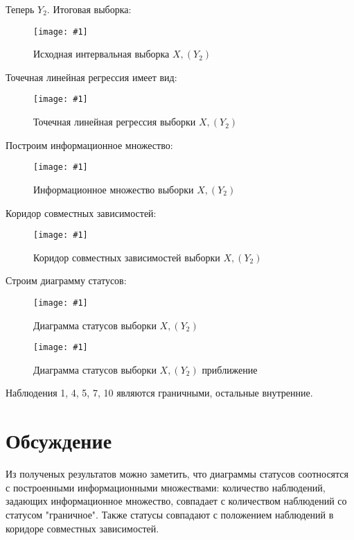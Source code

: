 \documentclass[a4paper,12pt]{article}
\newcommand{\plot}[3]{
    \begin{figure}[H]
        \begin{center}
            \texttt{[image: \#1]}
            \caption{#2}
            \label{#3}
        \end{center}
    \end{figure}
}
\begin{document}
    Теперь $ Y_2 $. Итоговая выборка:
    \plot{img/X, (Y2).png}{Исходная интервальная выборка $ X, (Y_2) $}{p:y2}

    Точечная линейная регрессия имеет вид: 
    \plot{img/Regression X, (Y2).png}{Точечная линейная регрессия выборки $ X, (Y_2) $}{p:regY2}

    Построим информационное множество:
    \plot{img/Inform X, (Y2).png}{Информационное множество выборки $ X, (Y_2) $}{p:infY2}

    Коридор совместных зависимостей:
    \plot{img/Corridor X, (Y2).png}{Коридор совместных зависимостей выборки $ X, (Y_2) $}{p:corY2}

    Строим диаграмму статусов:
    \plot{img/Status diagram X, (Y2) textless.png}{Диаграмма статусов выборки $ X, (Y_2) $}{p:dsY2}

    \plot{img/Status diagram X, (Y2) zoom.png}{Диаграмма статусов выборки $ X, (Y_2) $ приближение}{p:dszY2}

    Наблюдения 1, 4, 5, 7, 10 являются граничными, остальные внутренние.
    
    \section{Обсуждение}
    \quad Из полученых результатов можно заметить, что диаграммы статусов соотносятся с построенными информационными множествами: количество наблюдений, задающих информационное множество, совпадает с количеством наблюдений со статусом "граничное". Также статусы совпадают с положением наблюдений в коридоре совместных зависимостей.
\end{document}
